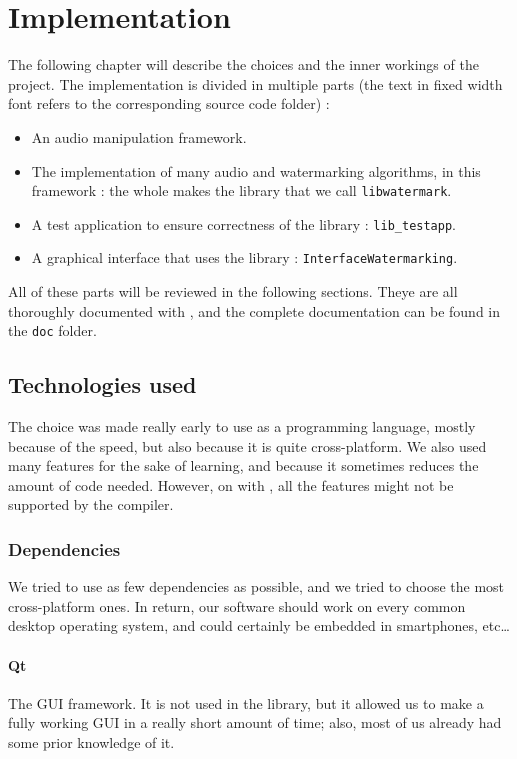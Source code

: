 \chapter{Implementation}
The following chapter will describe the choices and the inner workings of the project.
The implementation is divided in multiple parts (the text in fixed width font refers to the corresponding source code folder) : 

\begin{itemize}
\item An audio manipulation framework.
\item The implementation of many audio and watermarking algorithms, in this framework : the whole makes the library that we call \texttt{libwatermark}.
\item A test application to ensure correctness of the library : \texttt{lib\_testapp}.
\item A graphical interface that uses the library : \texttt{InterfaceWatermarking}.
\end{itemize}

All of these parts will be reviewed in the following sections. Theye are all thoroughly documented with , and the complete documentation can be found in the \texttt{doc} folder.

\section{Technologies used}
The choice was made really early to use  as a programming language, mostly because of the speed, but also because it is quite cross-platform. We also used many  features for the sake of learning, and because it sometimes reduces the amount of code needed. However, on  with , all the features might not be supported by the compiler.

\subsection{Dependencies}
We tried to use as few dependencies as possible, and we tried to choose the most cross-platform ones. In return, our software should work on every common desktop operating system, and could certainly be embedded in smartphones, etc\dots
\subsubsection{Qt}
The GUI framework. It is not used in the library, but it allowed us to make a fully working \ac{GUI} in a really short amount of time; also, most of us already had some prior knowledge of it.
